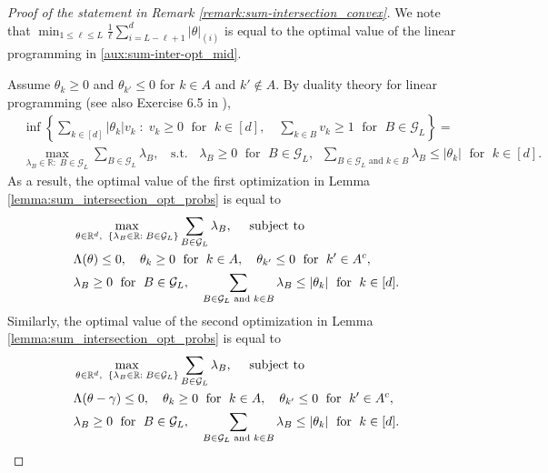 \documentclass[aap,preprint]{imsart}
\newcommand{\bR}{{\mathbb{R}}}
\theoremstyle{plain}
\theoremstyle{definition}
\begin{document}
\begin{appendix}
\begin{proof}[Proof of the statement in Remark \ref{remark:sum-intersection_convex}]
We note that $\min_{1 \leq \ell \leq L} \frac{1}{\ell} \sum_{i = L - \ell + 1}^{d} |\theta|_{(i)}$ is equal to the optimal value of the linear programming in \eqref{aux:sum-inter-opt_mid}.

Assume $\theta_k \geq 0$ and $\theta_{k'} \leq 0$ for $k \in A$ and $k' \not \in A$. By duality theory for linear programming \citep[Proposition 6.4.2]{bertsekas2003convex} (see also Exercise 6.5 in \cite{bertsekas2003convex}), 
\begin{align*}
&\inf\left\{\sum_{k \in [d]} |\theta_k| v_k \;:\;  v_k \geq 0\; \text{ for } \;k \in [d],  \quad 
 \sum_{k \in B} v_k \geq 1\; \text{ for } \;B \in \mathcal{G}_L \right\} = \\
&\max_{\lambda_B \in \bR:\; B \in \mathcal{G}_L} \sum_{B \in \mathcal{G}_L} \lambda_B, \;\; \text{ s.t. }\;\;  \lambda_B \geq 0 \;\text{ for }\; B \in \mathcal{G}_L,\;\; \sum_{B \in \mathcal{G}_L \text{ and } k \in B} \lambda_B \leq |\theta_k| \; \text{ for }\; k \in [d].
\end{align*}
As a result, the optimal value of the first optimization in Lemma \ref{lemma:sum_intersection_opt_probs} is equal to
\begin{align}\label{opt:sum_inter_equiv}
\begin{split}
       & \max_{\theta \in \bR^d,\;\; \{\lambda_B \in \bR:\; B \in \mathcal{G}_L\}} \sum_{B \in \mathcal{G}_L} \lambda_B, 
  \quad \textup{ subject to }  \\
& \Lambda(\theta) \leq 0, \quad \theta_k \geq 0 \;\text{ for }\; k \in A, \quad \theta_{k'} \leq 0 \;\text{ for }\; k' \in A^c,  \\ 
&   \lambda_B \geq 0 \;\text{ for }\; B \in \mathcal{G}_L,\quad \sum_{B \in \mathcal{G}_L \text{ and } k \in B} \lambda_B \leq |\theta_k| \; \text{ for }\; k \in [d].
\end{split}
\end{align}
Similarly, the optimal value of  the second optimization in Lemma \ref{lemma:sum_intersection_opt_probs} is equal to 
\begin{align}\label{opt:sum_inter_equiv2}
\begin{split}
       & \max_{\theta \in \bR^d,\;\; \{\lambda_B \in \bR:\; B \in \mathcal{G}_L\}} \sum_{B \in \mathcal{G}_L} \lambda_B, 
  \quad \textup{ subject to }  \\
& \Lambda(\theta - \gamma) \leq 0, \quad \theta_k \geq 0 \;\text{ for }\; k \in A, \quad \theta_{k'} \leq 0 \;\text{ for }\; k' \in A^c,  \\ 
&   \lambda_B \geq 0 \;\text{ for }\; B \in \mathcal{G}_L,\quad \sum_{B \in \mathcal{G}_L \text{ and } k \in B} \lambda_B \leq |\theta_k| \; \text{ for }\; k \in [d].
\end{split}
\end{align}
\end{proof}


\end{appendix}
\end{document}
